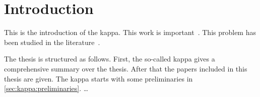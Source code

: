 \section{Introduction}
\label{sec:kappa:introduction}

This is the introduction of the kappa. This work is important~\cite{Alon00Algebraic,Alon99Combinatorial,AR23MCSP}. This problem has been studied in the literature~\cite{AN05Chromatic,AR22PerfectMatchingJournal,BBKMW21SpectralPlanting}.

The thesis is structured as follows. First, the so-called kappa gives a comprehensive summary over the thesis. After that the papers included in this thesis are given. The kappa starts with some preliminaries in \cref{sec:kappa:preliminaries}. \dots